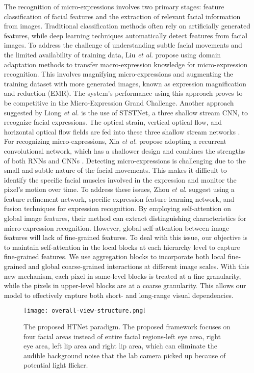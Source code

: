 \documentclass[review,12pt, 3p]{elsarticle}
\begin{document}
The recognition of micro-expressions involves two primary stages: feature classification of facial features and the extraction of relevant facial information from images. Traditional classification methods often rely on artificially generated features, while deep learning techniques automatically detect features from facial images. To address the challenge of understanding subtle facial movements and the limited availability of training data, Liu \textit{et al.} \cite{ref-8} propose using domain adaptation methods to transfer macro-expression knowledge for micro-expression recognition. This involves magnifying micro-expressions and augmenting the training dataset with more generated images, known as expression magnification and reduction (EMR). The system's performance using this approach proves to be competitive in the Micro-Expression Grand Challenge. Another approach suggested by Liong \textit{et al.} is the use of STSTNet, a three shallow stream CNN, to recognize facial expressions. The optical strain, vertical optical flow, and horizontal optical flow fields are fed into these three shallow stream networks \cite{ref-5}. For recognizing micro-expressions, Xia \textit{et al.} propose adopting a recurrent convolutional network, which has a shallower design and combines the strengths of both RNNs and CNNs \cite{ref-6}. Detecting micro-expressions is challenging due to the small and subtle nature of the facial movements. This makes it difficult to identify the specific facial muscles involved in the expression and monitor the pixel's motion over time. To address these issues, Zhou \textit{et al.} \cite{ref-15} suggest using a feature refinement network, specific expression feature learning network, and fusion techniques for expression recognition. By employing self-attention on global image features, their method can extract distinguishing characteristics for micro-expression recognition. However, global self-attention between image features will lack of fine-grained features. To deal with this issue,  our objective is to maintain self-attention in the local blocks at each hierarchy level to capture fine-grained features. We use aggregation blocks to incorporate both local fine-grained and global coarse-grained interactions at different image scales. With this new mechanism, each pixel in same-level blocks is treated at a fine granularity, while the pixels in upper-level blocks are at a coarse granularity. This allows our model to effectively capture both short- and long-range visual dependencies.\\
  \begin{figure*}[t]
 \centering
  \texttt{[image: overall-view-structure.png]}
  \caption{The proposed HTNet paradigm. The proposed framework focuses on four facial areas instead of entire facial regions-left eye area, right eye area, left lip area and right lip area, which can eliminate the audible background noise that the lab camera picked up because of potential light flicker. }
  \label{overall-view-structure}
\end{figure*}
\end{document}
